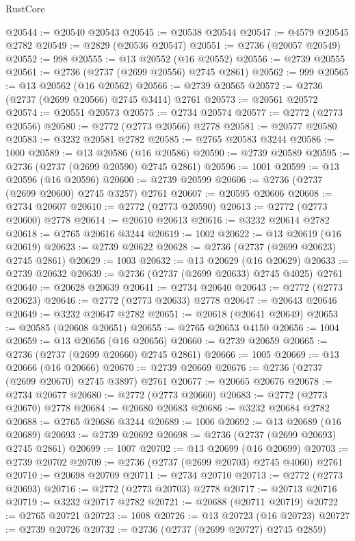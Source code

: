 \begin{lexlean}{RustCore}
\begin{coremodule}
@20544 := @20540 @20543
@20545 := @20538 @20544
@20547 := @4579 @20545 @2782
@20549 := @2829 (@20536 @20547)
@20551 := @2736 (@20057 @20549)
@20552 := 998
@20555 := @13 @20552 (@16 @20552)
@20556 := @2739 @20555
@20561 := @2736 (@2737 (@2699 @20556) @2745 @2861)
@20562 := 999
@20565 := @13 @20562 (@16 @20562)
@20566 := @2739 @20565
@20572 := @2736 (@2737 (@2699 @20566) @2745 @3414) @2761
@20573 := @20561 @20572
@20574 := @20551 @20573
@20575 := @2734 @20574
@20577 := @2772 (@2773 @20556)
@20580 := @2772 (@2773 @20566) @2778
@20581 := @20577 @20580
@20583 := @3232 @20581 @2782
@20585 := @2765 @20583 @3244
@20586 := 1000
@20589 := @13 @20586 (@16 @20586)
@20590 := @2739 @20589
@20595 := @2736 (@2737 (@2699 @20590) @2745 @2861)
@20596 := 1001
@20599 := @13 @20596 (@16 @20596)
@20600 := @2739 @20599
@20606 := @2736 (@2737 (@2699 @20600) @2745 @3257) @2761
@20607 := @20595 @20606
@20608 := @2734 @20607
@20610 := @2772 (@2773 @20590)
@20613 := @2772 (@2773 @20600) @2778
@20614 := @20610 @20613
@20616 := @3232 @20614 @2782
@20618 := @2765 @20616 @3244
@20619 := 1002
@20622 := @13 @20619 (@16 @20619)
@20623 := @2739 @20622
@20628 := @2736 (@2737 (@2699 @20623) @2745 @2861)
@20629 := 1003
@20632 := @13 @20629 (@16 @20629)
@20633 := @2739 @20632
@20639 := @2736 (@2737 (@2699 @20633) @2745 @4025) @2761
@20640 := @20628 @20639
@20641 := @2734 @20640
@20643 := @2772 (@2773 @20623)
@20646 := @2772 (@2773 @20633) @2778
@20647 := @20643 @20646
@20649 := @3232 @20647 @2782
@20651 := @20618 (@20641 @20649)
@20653 := @20585 (@20608 @20651)
@20655 := @2765 @20653 @4150
@20656 := 1004
@20659 := @13 @20656 (@16 @20656)
@20660 := @2739 @20659
@20665 := @2736 (@2737 (@2699 @20660) @2745 @2861)
@20666 := 1005
@20669 := @13 @20666 (@16 @20666)
@20670 := @2739 @20669
@20676 := @2736 (@2737 (@2699 @20670) @2745 @3897) @2761
@20677 := @20665 @20676
@20678 := @2734 @20677
@20680 := @2772 (@2773 @20660)
@20683 := @2772 (@2773 @20670) @2778
@20684 := @20680 @20683
@20686 := @3232 @20684 @2782
@20688 := @2765 @20686 @3244
@20689 := 1006
@20692 := @13 @20689 (@16 @20689)
@20693 := @2739 @20692
@20698 := @2736 (@2737 (@2699 @20693) @2745 @2861)
@20699 := 1007
@20702 := @13 @20699 (@16 @20699)
@20703 := @2739 @20702
@20709 := @2736 (@2737 (@2699 @20703) @2745 @4060) @2761
@20710 := @20698 @20709
@20711 := @2734 @20710
@20713 := @2772 (@2773 @20693)
@20716 := @2772 (@2773 @20703) @2778
@20717 := @20713 @20716
@20719 := @3232 @20717 @2782
@20721 := @20688 (@20711 @20719)
@20722 := @2765 @20721
@20723 := 1008
@20726 := @13 @20723 (@16 @20723)
@20727 := @2739 @20726
@20732 := @2736 (@2737 (@2699 @20727) @2745 @2859)

\end{coremodule}
\end{lexlean}
